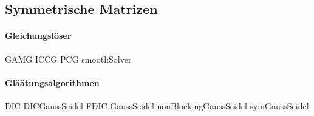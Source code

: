 \subsection{Symmetrische Matrizen}

\paragraph{Gleichungslöser}
GAMG
ICCG
PCG
smoothSolver

\paragraph{Gläätungsalgorithmen}

DIC
DICGaussSeidel
FDIC
GaussSeidel
nonBlockingGaussSeidel
symGaussSeidel




		

\newpage